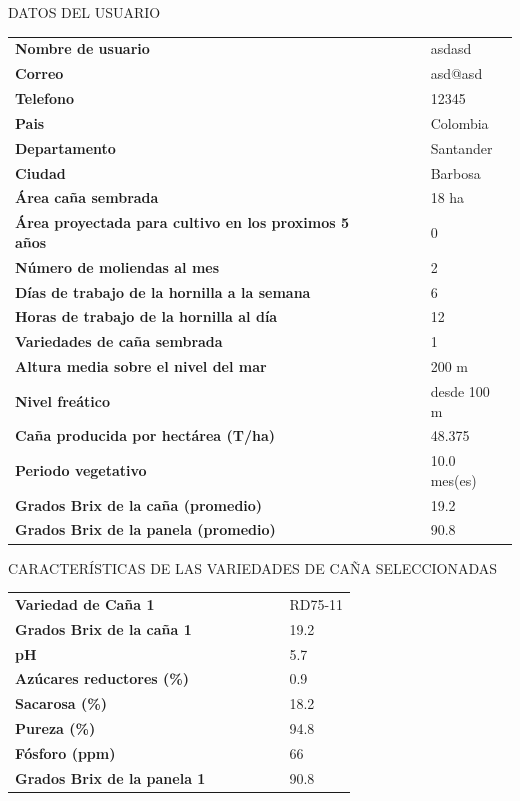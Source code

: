 \documentclass{article}%
\begin{document}
\newpage%
\begin{center}%
\begin{Huge}%
DATOS DEL USUARIO%
\end{Huge}%
\linebreak%
\end{center}%
\begin{tabular}{lccccl}%
\textbf{Nombre de usuario}& & & & &asdasd\\%
\textbf{Correo}& & & & &asd@asd\\%
\textbf{Telefono}& & & & &12345\\%
\textbf{Pais}& & & & &Colombia\\%
\textbf{Departamento}& & & & &Santander\\%
\textbf{Ciudad}& & & & &Barbosa\\%
\textbf{Área caña sembrada}& & & & &18 ha\\%
\textbf{Área proyectada para cultivo en los proximos 5 años}& & & & &0\\%
\textbf{Número de moliendas al mes}& & & & &2\\%
\textbf{Días de trabajo de la hornilla a la semana}& & & & &6\\%
\textbf{Horas de trabajo de la hornilla al día}& & & & &12\\%
\textbf{Variedades de caña sembrada}& & & & &1\\%
\textbf{Altura media sobre el nivel del mar}& & & & &200 m\\%
\textbf{Nivel freático}& & & & &desde 100 m\\%
\textbf{Caña producida por hectárea (T/ha)}& & & & &48.375\\%
\textbf{Periodo vegetativo}& & & & &10.0 mes(es)\\%
\textbf{Grados Brix de la caña (promedio)}& & & & &19.2\\%
\textbf{Grados Brix de la panela (promedio)}& & & & &90.8\\%
\end{tabular}%
\newpage%
\begin{center}%
\begin{Huge}%
CARACTERÍSTICAS DE LAS VARIEDADES DE CAÑA SELECCIONADAS%
\end{Huge}%
\linebreak%
\end{center}%
\begin{tabular}{lcccccl}%
\textbf{Variedad de Caña 1}& & & & & &RD75{-}11\\%
\textbf{Grados Brix de la caña 1}& & & & & &19.2\\%
\textbf{pH}& & & & & &5.7\\%
\textbf{Azúcares reductores (\%)}& & & & & &0.9\\%
\textbf{Sacarosa (\%)}& & & & & &18.2\\%
\textbf{Pureza (\%)}& & & & & &94.8\\%
\textbf{Fósforo (ppm)}& & & & & &66\\%
\textbf{Grados Brix de la panela 1}& & & & & &90.8\\%
\end{tabular}%
\linebreak%
\newline%
%
\linebreak%
\end{document}

